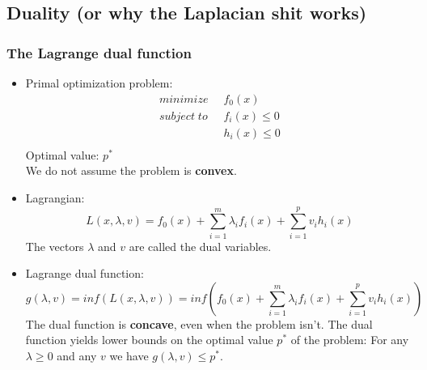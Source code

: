 \documentclass{scrartcl}
\begin{document}
\subsection{Duality (or why the Laplacian shit works)}
\subsubsection{The Lagrange dual function}
\begin{itemize}
    \item
        Primal optimization problem:
        \begin{align*}
            minimize \; \; & f_0(x)\\
            subject \; to \; \; & f_i(x) \leq 0 \\ %
            & h_i(x) \leq 0 \\
        \end{align*}
        Optimal value: $p^*$\\
        We do not assume the problem is \textbf{convex}.
    \item
        Lagrangian:
        $$ L(x, \lambda, v) = f_0(x) + \sum_{i=1}^{m} \lambda_i f_i(x) + \sum_{i=1}^{p} v_i h_i(x)$$
        The vectors $\lambda$ and $v$ are called the dual variables.
    \item
        Lagrange dual function:
        $$ g(\lambda, v) = inf(L(x, \lambda, v)) = inf(f_0(x) + \sum_{i=1}^{m} \lambda_i f_i(x) + \sum_{i=1}^{p} v_i h_i(x))$$
        The dual function is \textbf{concave}, even when the problem isn't.
        The dual function yields lower bounds on the optimal value $p^*$ of the problem: For any $\lambda \geq 0$ and any $v$ we have $g(\lambda, v) \leq p^*$.
\end{itemize}
\end{document}
